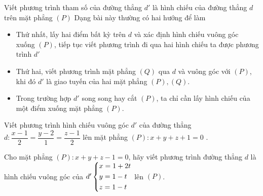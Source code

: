 \begin{dang}{Viết phương trình tham số của đường thẳng $d'$ là hình chiếu của đường thẳng $d$ trên mặt phẳng $(P)$}
	Dạng bài này thường có hai hướng để làm
\begin{itemize}
		\item Thứ nhất, lấy hai điểm bất kỳ trên $d$ và xác định hình chiếu vuông góc xuống $(P)$, tiếp tục viết phương trình đi qua hai hình chiếu ta được phương trình $d'$
		\item Thứ hai, viết phương trình mặt phẳng $(Q)$ qua $d$ và vuông góc với $(P)$, khi đó $d'$ là giao tuyến của hai mặt phẳng $(P),(Q)$.
		\item Trong trường hợp $d'$ song song hay cắt $(P)$, ta chỉ cần lấy hình chiếu của một điểm xuống mặt phẳng $(P)$.
	\end{itemize}
\end{dang}
\begin{vd}%
	Viết phương trình hình chiếu vuông góc $d'$ của đường thẳng $d:\dfrac{x-1}{2}=\dfrac{y-2}{1}=\dfrac{z-1}{2}$ lên mặt phẳng $(P): x+y+z+1=0$ .
\end{vd}
\begin{vd}%
	Cho mặt phẳng $(P):x+y+z-1=0$, hãy viết phương trình đường thẳng $d$ là hình chiếu vuông góc của $d'\left\{\begin{aligned}&x=1+2t\\&y=1-t\\&z=1-t\end{aligned}\right.$  lên $(P)$.
\end{vd}

